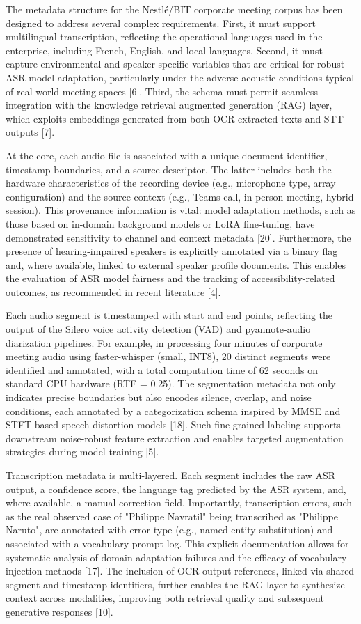\documentclass[12pt,a4paper]{article}
\begin{document}
The metadata structure for the Nestlé/BIT corporate meeting corpus has been designed to address several complex requirements. First, it must support multilingual transcription, reflecting the operational languages used in the enterprise, including French, English, and local languages. Second, it must capture environmental and speaker-specific variables that are critical for robust ASR model adaptation, particularly under the adverse acoustic conditions typical of real-world meeting spaces [6]. Third, the schema must permit seamless integration with the knowledge retrieval augmented generation (RAG) layer, which exploits embeddings generated from both OCR-extracted texts and STT outputs [7].


At the core, each audio file is associated with a unique document identifier, timestamp boundaries, and a source descriptor. The latter includes both the hardware characteristics of the recording device (e.g., microphone type, array configuration) and the source context (e.g., Teams call, in-person meeting, hybrid session). This provenance information is vital: model adaptation methods, such as those based on in-domain background models or LoRA fine-tuning, have demonstrated sensitivity to channel and context metadata [20]. Furthermore, the presence of hearing-impaired speakers is explicitly annotated via a binary flag and, where available, linked to external speaker profile documents. This enables the evaluation of ASR model fairness and the tracking of accessibility-related outcomes, as recommended in recent literature [4].


Each audio segment is timestamped with start and end points, reflecting the output of the Silero voice activity detection (VAD) and pyannote-audio diarization pipelines. For example, in processing four minutes of corporate meeting audio using faster-whisper (small, INT8), 20 distinct segments were identified and annotated, with a total computation time of 62 seconds on standard CPU hardware (RTF = 0.25). The segmentation metadata not only indicates precise boundaries but also encodes silence, overlap, and noise conditions, each annotated by a categorization schema inspired by MMSE and STFT-based speech distortion models [18]. Such fine-grained labeling supports downstream noise-robust feature extraction and enables targeted augmentation strategies during model training [5].


Transcription metadata is multi-layered. Each segment includes the raw ASR output, a confidence score, the language tag predicted by the ASR system, and, where available, a manual correction field. Importantly, transcription errors, such as the real observed case of "Philippe Navratil" being transcribed as "Philippe Naruto", are annotated with error type (e.g., named entity substitution) and associated with a vocabulary prompt log. This explicit documentation allows for systematic analysis of domain adaptation failures and the efficacy of vocabulary injection methods [17]. The inclusion of OCR output references, linked via shared segment and timestamp identifiers, further enables the RAG layer to synthesize context across modalities, improving both retrieval quality and subsequent generative responses [10].
\end{document}

